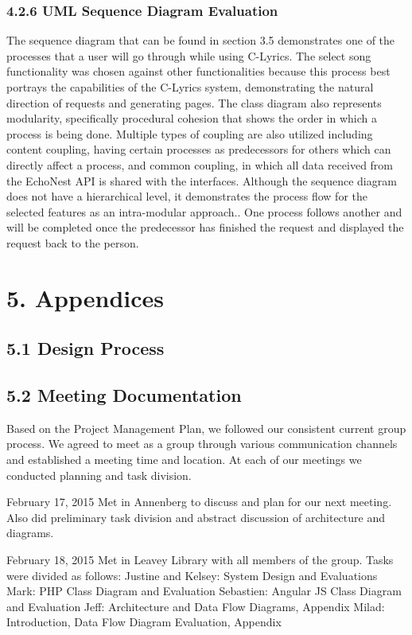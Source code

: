 \documentclass[]{article}
\begin{document}
\subsubsection{4.2.6 UML Sequence Diagram
Evaluation}\label{uml-sequence-diagram-evaluation}

The sequence diagram that can be found in section 3.5 demonstrates one
of the processes that a user will go through while using C-Lyrics. The
select song functionality was chosen against other functionalities
because this process best portrays the capabilities of the C-Lyrics
system, demonstrating the natural direction of requests and generating
pages. The class diagram also represents modularity, specifically
procedural cohesion that shows the order in which a process is being
done. Multiple types of coupling are also utilized including content
coupling, having certain processes as predecessors for others which can
directly affect a process, and common coupling, in which all data
received from the EchoNest API is shared with the interfaces. Although
the sequence diagram does not have a hierarchical level, it demonstrates
the process flow for the selected features as an intra-modular
approach.. One process follows another and will be completed once the
predecessor has finished the request and displayed the request back to
the person.

\section{5. Appendices}\label{appendices}

\subsection{5.1 Design Process}\label{design-process}

\subsection{5.2 Meeting Documentation}\label{meeting-documentation}

Based on the Project Management Plan, we followed our consistent current
group process. We agreed to meet as a group through various
communication channels and established a meeting time and location. At
each of our meetings we conducted planning and task division.

February 17, 2015 Met in Annenberg to discuss and plan for our next
meeting. Also did preliminary task division and abstract discussion of
architecture and diagrams.

February 18, 2015 Met in Leavey Library with all members of the group.
Tasks were divided as follows: Justine and Kelsey: System Design and
Evaluations Mark: PHP Class Diagram and Evaluation Sebastien: Angular JS
Class Diagram and Evaluation Jeff: Architecture and Data Flow Diagrams,
Appendix Milad: Introduction, Data Flow Diagram Evaluation, Appendix
\end{document}
